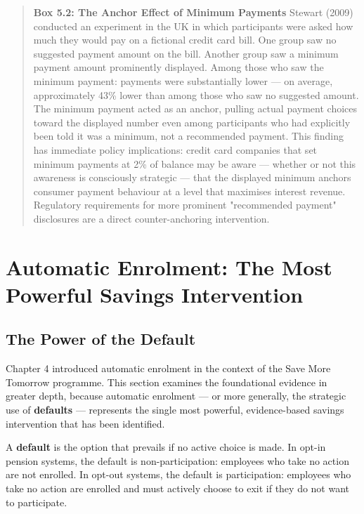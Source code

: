 \documentclass[12pt, letterpaper]{article}
\begin{document}
\begin{quote}
\textbf{Box 5.2: The Anchor Effect of Minimum Payments}
Stewart (2009) conducted an experiment in the UK in which participants were asked how much they would pay on a fictional credit card bill. One group saw no suggested payment amount on the bill. Another group saw a minimum payment amount prominently displayed.
Among those who saw the minimum payment: payments were substantially lower --- on average, approximately 43\% lower than among those who saw no suggested amount. The minimum payment acted as an anchor, pulling actual payment choices toward the displayed number even among participants who had explicitly been told it was a minimum, not a recommended payment.
This finding has immediate policy implications: credit card companies that set minimum payments at 2\% of balance may be aware --- whether or not this awareness is consciously strategic --- that the displayed minimum anchors consumer payment behaviour at a level that maximises interest revenue. Regulatory requirements for more prominent "recommended payment" disclosures are a direct counter-anchoring intervention.
\end{quote}

\medskip


\section{Automatic Enrolment: The Most Powerful Savings Intervention}



\subsection{The Power of the Default}


Chapter 4 introduced automatic enrolment in the context of the Save More Tomorrow programme. This section examines the foundational evidence in greater depth, because automatic enrolment --- or more generally, the strategic use of \textbf{defaults} --- represents the single most powerful, evidence-based savings intervention that has been identified.

A \textbf{default} is the option that prevails if no active choice is made. In opt-in pension systems, the default is non-participation: employees who take no action are not enrolled. In opt-out systems, the default is participation: employees who take no action are enrolled and must actively choose to exit if they do not want to participate.
\end{document}
